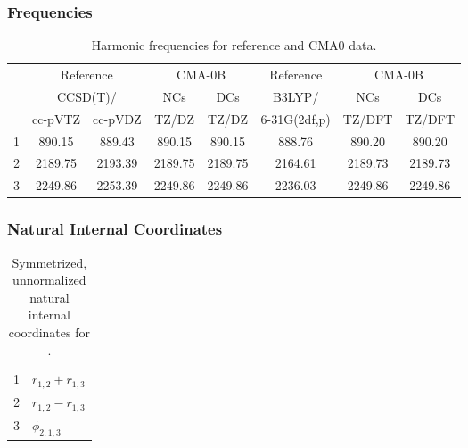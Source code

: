 \documentclass[10pt,oneside]{article}
\begin{document}
\subsubsection*{Frequencies}
\begin{table}[h!]
\centering
\caption{Harmonic frequencies for reference and CMA0 data.}
\begin{tabular}{cccccccc}
\toprule
{} & \multicolumn{2}{c}{Reference} & \multicolumn{2}{c}{CMA-0B} &    Reference & \multicolumn{2}{c}{CMA-0B} \\
{} & \multicolumn{2}{c}{CCSD(T)/} &     NCs &     DCs &       B3LYP/ &     NCs &     DCs \\
{} &   cc-pVTZ & cc-pVDZ &   TZ/DZ &   TZ/DZ & 6-31G(2df,p) &  TZ/DFT &  TZ/DFT \\
\midrule
1 &    890.15 &  889.43 &  890.15 &  890.15 &       888.76 &  890.20 &  890.20 \\
2 &   2189.75 & 2193.39 & 2189.75 & 2189.75 &      2164.61 & 2189.73 & 2189.73 \\
3 &   2249.86 & 2253.39 & 2249.86 & 2249.86 &      2236.03 & 2249.86 & 2249.86 \\
\bottomrule
\end{tabular}
\end{table}

\clearpage

\subsubsection*{Natural Internal Coordinates}
\begin{table}[h!]
\centering
\caption{Symmetrized, unnormalized natural internal coordinates for .}
\small
\begin{tabular}{ll}
  1   & $r_{1,2} + r_{1,3}$ \\
  2   & $r_{1,2} - r_{1,3}$ \\
  3   & $\phi_{2,1,3}$ \\
\end{tabular}
\end{table}

\clearpage

\subsection{\ \ \ }
\end{document}
